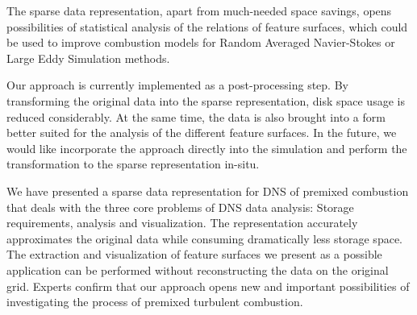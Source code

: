The sparse data representation, apart from much-needed space savings, opens
possibilities of statistical analysis of the relations of feature surfaces,
which could be used to improve combustion models for Random Averaged
Navier-Stokes or Large Eddy Simulation methods.

Our approach is currently implemented as a post-processing step. By transforming
the original data into the sparse representation, disk space usage is
reduced considerably. At the same time, the data is also brought into a form
better suited for the analysis of the different feature surfaces. In the future,
we would like incorporate the approach directly into the simulation and perform
the transformation to the sparse representation in-situ.

We have presented a sparse data representation for \ac{DNS} of premixed combustion
that deals with the three core problems of \ac{DNS} data analysis: Storage
requirements, analysis and visualization. The representation accurately
approximates the original data while consuming dramatically less storage space.
The extraction and visualization of feature surfaces we present as a possible
application can be performed without reconstructing the data on the original
grid. Experts confirm that our approach opens new and important possibilities
of investigating the process of premixed turbulent combustion.

%
